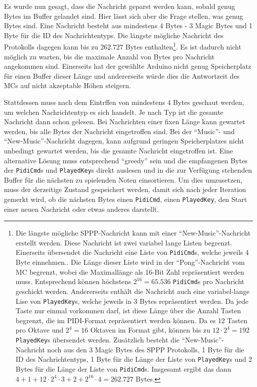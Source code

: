 Es wurde nun gesagt, dass die Nachricht geparst werden kann, sobald genug Bytes im Buffer gelandet sind.
Hier lässt sich aber die Frage stellen, was genug Bytes sind.
Eine Nachricht besteht aus mindestens 4 Bytes - 3 Magic Bytes und 1 Byte für die ID des Nachrichtentyps.
Die längste mögliche Nachricht des Protokolls dagegen kann bis zu $262.727$ Bytes enthalten\footnote{Die längste mögliche \ac{SPPP}-Nachricht kann mit einer \enquote{New-Music}-Nachricht erstellt werden. Diese Nachricht ist zwei variabel lange Listen begrenzt. Einerseits übersendet die Nachricht eine Liste von \lstinline|PidiCmd|s, welche jeweils 4 Byte einnehmen.. Die Länge dieser Liste wird in der \enquote{Pong}-Nachricht vom \ac{MC} begrenzt, wobei die Maximallänge als 16-Bit Zahl repräsentiert werden muss. Entsprechend können höchstens $2^{16} = 65.536$ \lstinline|PidiCmd|s pro Nachricht geschickt werden. Andererseits enthält die Nachricht auch eine variabel-lange Lise von \lstinline|PlayedKey|s, welche jeweils in 3 Bytes repräsentiert werden. Da jede Taste nur einmal vorkommen darf, ist diese Länge über die Anzahl Tasten begrenzt, die im \ac{PIDI}-Format repräsentiert werden können. Da es 12 Tasten pro Oktave und $2^4=16$ Oktaven im Format gibt, können bis zu $12 \cdot 2^4 = 192$ \lstinline|PlayedKey|s übersendet werden. Zusätzlich besteht die \enquote{New-Music}-Nachricht noch aus den 3 Magic Bytes des \ac{SPPP} Protokolls, 1 Byte für die ID des Nachrichtentyps, 1 Byte für die Länge der Liste von \lstinline|PlayedKey|s und 2 Bytes für die Länge der Liste von \lstinline|PidiCmd|s. Insgesamt ergibt das dann $4 + 1 + 12 \cdot 2^4 \cdot 3 + 2 + 2^{16} \cdot 4 = 262.727$ Bytes.}.
Es ist dadurch nicht möglich zu warten, bis die maximale Anzahl von Bytes pro Nachricht angekommen sind.
Einerseits hat der gewählte Arduino nicht genug Speicherplatz für einen Buffer dieser Länge und andererseits würde dies die Antwortzeit des \ac{MC}s auf nicht akzeptable Höhen steigern.

Stattdessen muss nach dem Eintrffen von mindestens 4 Bytes geschaut werden, um welchen Nachrichtentyp es sich handelt.
Je nach Typ ist die gesamte Nachricht dann schon gelesen.
Bei Nachrichten einer fixen Länge kann gewartet werden, bis alle Bytes der Nachricht eingetroffen sind.
Bei der \enquote{Music}- und \enquote{New-Music}-Nachricht dagegen, kann aufgrund geringen Speicherplatzes nicht unbedingt gewartet werden, bis die gesamte Nachricht eingetroffen ist.
Eine alternative Lösung muss entsprechend \enquote{greedy} sein und die empfangenen Bytes der \lstinline|PidiCmd|s und \lstinline|PlayedKey|s direkt auslesen und in die zur Verfügung stehenden Buffer für die nächsten zu spielenden Noten einsortieren.
Um dies umzusetzen, muss der derzeitige Zustand gespeichert werden, damit sich nach jeder Iteration gemerkt wird, ob die nächsten Bytes einen \lstinline|PidiCmd|, einen \lstinline|PlayedKey|, den Start einer neuen Nachricht oder etwas anderes darstellt.


